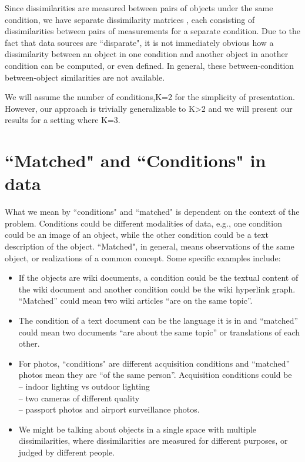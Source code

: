 \documentclass[11pt]{article} %
\begin{document}
 Since dissimilarities are  measured between pairs of objects under the same condition,
 we have separate dissimilarity matrices , each consisting of dissimilarities between pairs of  measurements for a separate condition.
 Due to the fact that data sources are ``disparate", it is not immediately obvious how  a dissimilarity between an object in one condition and another object in another condition  can be computed, or even defined.  In general, these between-condition between-object  similarities are not available. 

We will assume the number of conditions,K=2 for the  simplicity of presentation. However, our approach is trivially generalizable  to K>2 and we will present our results for a setting where K=3.

\section{``Matched" and ``Conditions" in data}

What we mean by ``conditions" and ``matched" is dependent on the context of the  problem. Conditions could be different modalities of data, e.g., one condition could be  an image of an object, while the other condition could be a text description of the object. ``Matched", in general, means observations of the same object, or realizations of a common concept. Some specific examples include:

  \begin{itemize}
    \item
If the objects are wiki documents, a condition could be the textual content of the wiki document and another condition could be the wiki hyperlink graph. ``Matched'' could mean two  wiki articles ``are on the same topic''.
\item
The condition of a text document can be the language it is in and ``matched'' could mean two documents ``are about the same topic'' or translations of each other.

    \item For photos, ``conditions" are different acquisition conditions and ``matched'' photos mean they are  ``of the same person''. Acquisition conditions could be\\
    \hspace*{0.1 in}-- indoor lighting vs outdoor lighting\\
    \hspace*{0.1 in}-- two cameras of different quality\\
    \hspace*{0.1 in}-- passport photos and airport surveillance photos.
    \item We might be talking about objects in a single space with multiple dissimilarities, where dissimilarities are measured for different purposes, or judged by different people.
  \end{itemize}
\end{document}
